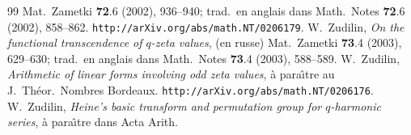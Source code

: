 \documentclass[12pt]{amsart}
\theoremstyle{remark}
\numberwithin{equation}{section}
\begin{document}
\begin{thebibliography}{99}
Mat.\ Zametki {\bf 72}.6 (2002), 936--940;
trad.\ en anglais dans Math.\ Notes {\bf 72}.6 (2002), 858--862.
{\tt http\!\!\!://arXiv.org/abs/math.NT/0206179}.
 W.~Zudilin,
{\it On the functional transcendence of $q$-zeta values}, (en russe)
Mat.\ Zametki {\bf 73}.4 (2003), 629--630;
trad.\ en anglais dans Math.\ Notes {\bf 73}.4 (2003), 588--589.
 W.~Zudilin, 
{\it Arithmetic of linear forms involving odd zeta values},  
{\`a} para{\^\i}tre au J.~Th{\'e}or.\ Nombres Bordeaux. 
{\tt http\!\!\!://arXiv.org/abs/math.NT/0206176}.
 W.~Zudilin,
{\it Heine's basic transform and permutation group for $q$-harmonic series}, 
{\`a} para{\^\i}tre dans Acta Arith.
               

\end{thebibliography}
\end{document}

